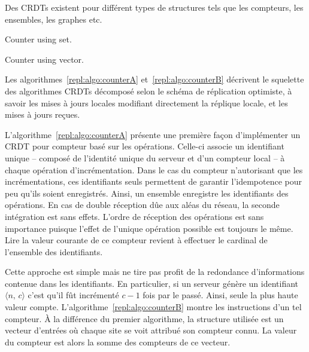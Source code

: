 Des CRDTs existent pour différent types de structures tels que les compteurs,
les ensembles, les graphes etc.\\
{\noindent%
\begin{minipage}[t]{0.48\textwidth}
  \begin{algorithm}[H]
    
    \caption{\label{repl:algo:counterA} Counter using set.}
  \end{algorithm}
\end{minipage}%
\hfill%
\begin{minipage}[t]{0.48\textwidth}
  \begin{algorithm}[H]
    
    \caption{\label{repl:algo:counterB} Counter using vector.}
  \end{algorithm}
\end{minipage}
}

Les algorithmes~\ref{repl:algo:counterA} et~\ref{repl:algo:counterB} décrivent
le squelette des algorithmes CRDTs décomposé selon le schéma de réplication
optimiste, à savoir les mises à jours locales modifiant directement la réplique
locale, et les mises à jours reçues.

L'algorithme~\ref{repl:algo:counterA} présente une première façon d'implémenter
un CRDT pour compteur basé sur les opérations. Celle-ci associe un identifiant
unique -- composé de l'identité unique du serveur et d'un compteur local -- à
chaque opération d'incrémentation. Dans le cas du compteur n'autorisant que les
incrémentations, ces identifiants seuls permettent de garantir l'idempotence
pour peu qu'ils soient enregistrés. Ainsi, un ensemble enregistre les
identifiants des opérations. En cas de double réception dûe aux aléas du réseau,
la seconde intégration est sans effets. L'ordre de réception des opérations est
sans importance puisque l'effet de l'unique opération possible est toujours le
même. Lire la valeur courante de ce compteur revient à effectuer le cardinal de
l'ensemble des identifiants.

Cette approche est simple mais ne tire pas profit de la redondance
d'informations contenue dans les identifiants. En particulier, si un serveur
génère un identifiant $\langle n,\, c\rangle$ c'est qu'il fût incrémenté $c-1$
fois par le passé. Ainsi, seule la plus haute valeur
compte. L'algorithme~\ref{repl:algo:counterB} montre les instructions d'un tel
compteur. À la différence du premier algorithme, la structure utilisée est un
vecteur d'entrées où chaque site se voit attribué son compteur connu. La valeur
du compteur est alors la somme des compteurs de ce vecteur.

